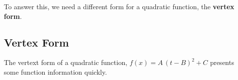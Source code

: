 \documentclass{ximera}
\begin{document}
To answer this, we need a different form for a quadratic function, the \textbf{vertex form}.


































































































\subsection*{Vertex Form}







The vertext form of a quadratic function, $f(x) = A \, (t-B)^2 + C$ presents some function information quickly.
\end{document}
